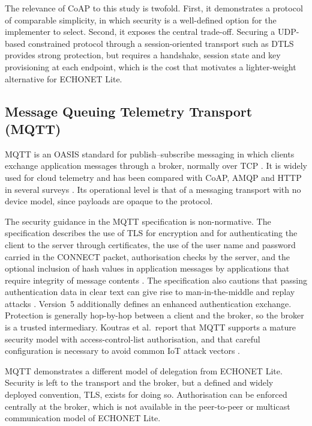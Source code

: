 The relevance of CoAP to this study is twofold. First, it demonstrates a protocol of comparable simplicity, in which security is a well-defined option for the implementer to select. Second, it exposes the central trade-off. Securing a UDP-based constrained protocol through a session-oriented transport such as DTLS provides strong protection, but requires a handshake, session state and key provisioning at each endpoint, which is the cost that motivates a lighter-weight alternative for ECHONET Lite.

\subsection{Message Queuing Telemetry Transport (MQTT)}
\label{sec:mqtt}

MQTT is an OASIS standard for publish--subscribe messaging in which clients exchange application messages through a broker, normally over TCP \cite{MQTT5}. It is widely used for cloud telemetry and has been compared with CoAP, AMQP and HTTP in several surveys \cite{Naik2017,Petrescu2025}. Its operational level is that of a messaging transport with no device model, since payloads are opaque to the protocol.

The security guidance in the MQTT specification is non-normative. The specification describes the use of TLS for encryption and for authenticating the client to the server through certificates, the use of the user name and password carried in the CONNECT packet, authorisation checks by the server, and the optional inclusion of hash values in application messages by applications that require integrity of message contents \cite{MQTT5}. The specification also cautions that passing authentication data in clear text can give rise to man-in-the-middle and replay attacks \cite{MQTT5}. Version~5 additionally defines an enhanced authentication exchange. Protection is generally hop-by-hop between a client and the broker, so the broker is a trusted intermediary. Koutras et al.\ report that MQTT supports a mature security model with access-control-list authorisation, and that careful configuration is necessary to avoid common IoT attack vectors \cite{Koutras2026}.

MQTT demonstrates a different model of delegation from ECHONET Lite. Security is left to the transport and the broker, but a defined and widely deployed convention, TLS, exists for doing so. Authorisation can be enforced centrally at the broker, which is not available in the peer-to-peer or multicast communication model of ECHONET Lite.

